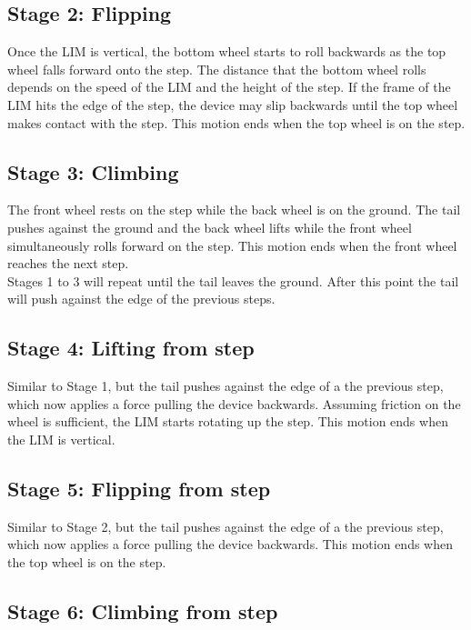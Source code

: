 \subsection*{Stage 2: Flipping}

Once the LIM is vertical, the bottom wheel starts to roll backwards as the top wheel falls forward onto the step. The distance that the bottom wheel rolls depends on the speed of the LIM and the height of the step. If the frame of the LIM hits the edge of the step, the device may slip backwards until the top wheel makes contact with the step. This motion ends when the top wheel is on the step.\\

\subsection*{Stage 3: Climbing}

The front wheel rests on the step while the back wheel is on the ground. The tail pushes against the ground and the back wheel lifts while the front wheel simultaneously rolls forward on the step. This motion ends when the front wheel reaches the next step.\\

Stages 1 to 3 will repeat until the tail leaves the ground. After this point the tail will push against the edge of the previous steps. 

\subsection*{Stage 4: Lifting from step}

Similar to Stage 1, but the tail pushes against the edge of a the previous step, which now applies a force pulling the device backwards. Assuming friction on the wheel is sufficient, the LIM starts rotating up the step. This motion ends when the LIM is vertical.

\subsection*{Stage 5: Flipping from step}

Similar to Stage 2, but the tail pushes against the edge of a the previous step, which now applies a force pulling the device backwards. This motion ends when the top wheel is on the step.\\

\subsection*{Stage 6: Climbing from step}

